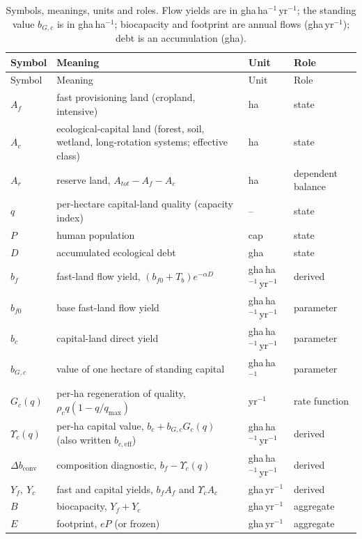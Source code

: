 \documentclass[11pt,a4paper]{article}
\newcommand{\dconv}{\Delta b_{\mathrm{conv}}}
\newcommand{\Ups}{\Upsilon_c}
\begin{document}
\begin{longtable}{>{\raggedright\arraybackslash}p{}>{\raggedright\arraybackslash}p{}>{\raggedright\arraybackslash}p{}>{\raggedright\arraybackslash}p{}}
\caption{Symbols, meanings, units and roles. Flow yields are in gha\,ha$^{-1}$\,yr$^{-1}$; the standing value $b_{G,c}$ is in gha\,ha$^{-1}$; biocapacity and footprint are annual flows (gha\,yr$^{-1}$); debt is an accumulation (gha).}\label{tab:si_symbols}\\
\toprule
Symbol & Meaning & Unit & Role \\
\midrule
\endfirsthead
\toprule
Symbol & Meaning & Unit & Role \\
\midrule
\endhead
$A_f$ & fast provisioning land (cropland, intensive) & ha & state \\
$A_c$ & ecological-capital land (forest, soil, wetland, long-rotation systems; effective class) & ha & state \\
$A_r$ & reserve land, $A_{tot}-A_f-A_c$ & ha & dependent balance \\
$q$ & per-hectare capital-land quality (capacity index) & -- & state \\
$P$ & human population & cap & state \\
$D$ & accumulated ecological debt & gha & state \\
$b_f$ & fast-land flow yield, $(b_{f0}+T_b)e^{-\alpha D}$ & gha\,ha$^{-1}$\,yr$^{-1}$ & derived \\
$b_{f0}$ & base fast-land flow yield & gha\,ha$^{-1}$\,yr$^{-1}$ & parameter \\
$b_c$ & capital-land direct yield & gha\,ha$^{-1}$\,yr$^{-1}$ & parameter \\
$b_{G,c}$ & value of one hectare of standing capital & gha\,ha$^{-1}$ & parameter \\
$G_c(q)$ & per-ha regeneration of quality, $\rho_cq(1-q/q_{\max})$ & yr$^{-1}$ & rate function \\
$\Ups(q)$ & per-ha capital value, $b_c+b_{G,c}G_c(q)$ (also written $b_{c,\mathrm{eff}}$) & gha\,ha$^{-1}$\,yr$^{-1}$ & derived \\
$\dconv$ & composition diagnostic, $b_f-\Ups(q)$ & gha\,ha$^{-1}$\,yr$^{-1}$ & derived \\
$Y_f,\ Y_c$ & fast and capital yields, $b_fA_f$ and $\Ups A_c$ & gha\,yr$^{-1}$ & derived \\
$B$ & biocapacity, $Y_f+Y_c$ & gha\,yr$^{-1}$ & aggregate \\
$E$ & footprint, $eP$ (or frozen) & gha\,yr$^{-1}$ & aggregate \\

\end{longtable}
\end{document}
